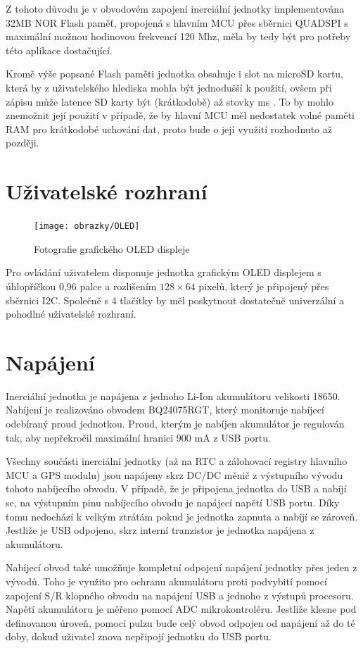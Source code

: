 Z tohoto důvodu je v obvodovém zapojení inerciální jednotky implementována 32MB NOR Flash paměť, propojená s hlavním \ac{MCU} přes sběrnici QUADSPI s maximální možnou hodinovou frekvencí 120 Mhz, měla by tedy být pro potřeby této aplikace dostačující. \cite{CgaRYSTpwKhEZZr7}

Kromě výše popsané Flash paměti jednotka obsahuje i slot na microSD kartu, která by z uživatelského hlediska mohla být jednodušší k použití, ovšem při zápisu může latence SD karty být (krátkodobě) až stovky ms \cite{Kraewinkel2020}. To by mohlo znemožnit její použití v případě, že by hlavní \ac{MCU} měl nedostatek volné paměti RAM pro krátkodobé uchování dat, proto bude o její využití rozhodnuto až později.

\section{Uživatelské rozhraní}
\begin{figure}[h]
    \centering
    \texttt{[image: obrazky/OLED]}
    \caption{Fotografie grafického OLED displeje}
\end{figure}
Pro ovládání uživatelem disponuje jednotka grafickým \ac{OLED} displejem s úhlopříčkou 0,96 palce a rozlišením $ 128 \times 64 $ pixelů, který je připojený přes sběrnici \ac{I2C}. Společně s 4 tlačítky by měl poskytnout dostatečně univerzální a pohodlné uživatelské rozhraní.

\section{Napájení}
Inerciální jednotka je napájena z jednoho Li-Ion akumulátoru velikosti 18650. Nabíjení je realizováno obvodem BQ24075RGT, který monitoruje nabíjecí odebíraný proud jednotkou. Proud, kterým je nabíjen akumulátor je regulován tak, aby nepřekročil maximální hranici 900 mA z USB portu. \cite{F5eZCtr2LLRsr9NT}

Všechny součásti inerciální jednotky (až na \ac{RTC} a zálohovací registry hlavního \ac{MCU} a \ac{GPS} modulu) jsou napájeny skrz DC/DC měnič z výstupního vývodu tohoto nabíjecího obvodu. V případě, že je připojena jednotka do \ac{USB} a nabíjí se, na výstupním pinu nabíjecího obvodu je napájecí napětí USB portu. Díky tomu nedochází k velkým ztrátám pokud je jednotka zapnuta a nabíjí se zároveň. Jestliže je \ac{USB} odpojeno, skrz interní tranzistor je jednotka napájena z akumulátoru. \cite{F5eZCtr2LLRsr9NT}

Nabíjecí obvod také umožňuje kompletní odpojení napájení jednotky přes jeden z vývodů. Toho je využito pro ochranu akumulátoru proti podvybití pomocí zapojení S/R klopného obvodu na napájení \ac{USB} a jednoho z výstupů procesoru. Napětí akumulátoru je měřeno pomocí \ac{ADC} mikrokontroléru. Jestliže klesne pod definovanou úroveň, pomocí pulzu bude celý obvod odpojen od napájení až do té doby, dokud uživatel znova nepřipojí jednotku do \ac{USB} portu.


